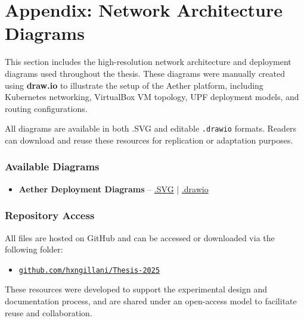 \chapter{Appendix: Network Architecture Diagrams}
\label{sec:appendix-network-diagrams}

This section includes the high-resolution network architecture and deployment diagrams used throughout the thesis. These diagrams were manually created using \textbf{draw.io} to illustrate the setup of the Aether platform, including Kubernetes networking, VirtualBox VM topology, UPF deployment models, and routing configurations.

All diagrams are available in both .SVG and editable \texttt{.drawio} formats. Readers can download and reuse these resources for replication or adaptation purposes.

\subsection*{Available Diagrams}

\begin{itemize}
    \item \textbf{Aether Deployment Diagrams} – \href{https://github.com/hxngillani/Thesis-2025/blob/d0960d3a9d816eca167b428b2a6cfdfa707a49eb/Deployment%20Diagrams/Aether%20Deployment%20Diagrams.svg}{.SVG} | \href{https://github.com/hxngillani/Thesis-2025/blob/d0960d3a9d816eca167b428b2a6cfdfa707a49eb/Deployment%20Diagrams/Deployment%20Diagrams%20.drawio}{.drawio}
\end{itemize}

\subsection*{Repository Access}
All files are hosted on GitHub and can be accessed or downloaded via the following folder:

\begin{itemize}
    \item \href{https://github.com/hxngillani/Thesis-2025/}{\texttt{github.com/hxngillani/Thesis-2025}}
\end{itemize}

\noindent These resources were developed to support the experimental design and documentation process, and are shared under an open-access model to facilitate reuse and collaboration.
